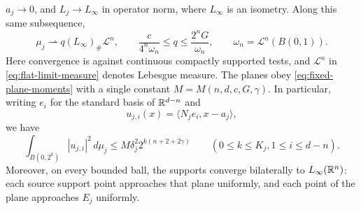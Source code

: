 \begin{proposition}
$a_j\to0$, and $L_j\to L_\infty$ in operator norm, where $L_\infty$ is
an isometry.  Along this same subsequence,
\begin{equation}\label{eq:flat-limit-measure}
 \mu_j\rightharpoonup q(L_\infty)_\#\mathcal L^n,
 \qquad \frac{c}{4^n\omega_n}\le q\le\frac{2^nG}{\omega_n},
 \qquad \omega_n=\mathcal L^n(B(0,1)).
\end{equation}
Here convergence is against continuous compactly supported tests, and
$\mathcal L^n$ in \eqref{eq:flat-limit-measure} denotes Lebesgue measure.
The planes obey \eqref{eq:fixed-plane-moments} with a single constant
$M=M(n,d,c,G,\gamma)$.  In particular, writing $e_i$ for the standard
basis of $\mathbb R^{d-n}$ and
\begin{equation}\label{eq:flat-limit-normal-coordinate}
 u_{j,i}(x)=\langle N_je_i,x-a_j\rangle,
\end{equation}
we have
\begin{equation}\label{eq:flat-limit-normal-moments}
 \int_{B(0,2^k)}|u_{j,i}|^2\,d\mu_j
 \le M\delta_j^2 2^{k(n+2+2\gamma)}
 \qquad(0\le k\le K_j, 1\le i\le d-n).
\end{equation}
Moreover, on every bounded ball, the supports converge bilaterally to
$L_\infty(\mathbb R^n)$: each source support point approaches that plane uniformly,
and each point of the plane approaches $E_j$ uniformly.
\end{proposition}

